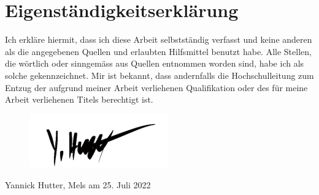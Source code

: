 \section{Eigenständigkeitserklärung}
Ich erkläre hiermit, dass ich diese Arbeit selbstständig verfasst und keine anderen als die angegebenen Quellen und erlaubten Hilfsmittel benutzt habe. Alle Stellen, die wörtlich oder sinngemäss aus Quellen entnommen worden sind, habe ich als solche gekennzeichnet. Mir ist bekannt, dass andernfalls die Hochschulleitung zum Entzug der aufgrund meiner Arbeit verliehenen Qualifikation oder des für meine Arbeit verliehenen Titels berechtigt ist.

\begin{figure}[h]
	\includegraphics[width=6cm]{images/signature.png}
\end{figure}
Yannick Hutter, Mels am 25. Juli 2022